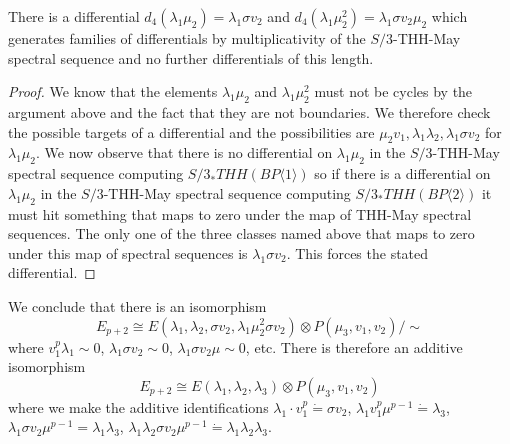 \begin{lem}
There is a differential $d_{4}(\lambda_1\mu_2)=\lambda_1\sigma v_2$ and $d_{4}(\lambda_1 \mu_2^2)=\lambda_1\sigma v_2\mu_2$ which generates families of differentials by multiplicativity of the $S/3$-THH-May spectral sequence and no further differentials of this length. 
\end{lem}
\begin{proof}
We know that the elements $\lambda_1\mu_2$ and $\lambda_1 \mu_2^2$ must not be cycles by the argument above and the fact that they are not boundaries. We therefore check the possible targets of a differential and the possibilities are $\mu_2v_1, \lambda_1\lambda_2, \lambda_1\sigma v_2$  for $\lambda_1\mu_2$. We now observe that there is no differential on $\lambda_1\mu_2$ in the $S/3$-THH-May spectral sequence computing $S/3_*THH(BP\langle 1\rangle )$ so if there is a differential on $\lambda_1\mu_2$ in the $S/3$-THH-May spectral sequence computing $S/3_*THH(BP\langle 2\rangle )$ it must hit something that maps to zero under the map of THH-May spectral sequences. The only one of the three classes named above that maps to zero under this map of spectral sequences is $\lambda_1\sigma v_2$. This forces the stated differential. 

\end{proof}

We conclude that there is an isomorphism 
\[E_{p+2} \cong  E(\lambda_1,\lambda_2,\sigma v_2, \lambda_1\mu_2^2\sigma v_2)\otimes P( \mu_3 ,v_1 ,v_2) / \sim \]
where $v_1^p\lambda_1 \sim 0$, $\lambda_1\sigma v_2\sim 0$, $\lambda_1\sigma v_2 \mu \sim 0$, etc. 
There is therefore an additive isomorphism 
\[ E_{p+2}\cong E(\lambda_1, \lambda_2, \lambda_3)\otimes P(\mu_3,v_1, v_2) \]
where we make the additive identifications $\lambda_1\cdot v_1^p\dot{=} \sigma v_2$, $\lambda_1v_1^p\mu^{p-1}\dot{=}\lambda_3$, $\lambda_1\sigma v_2\mu^{p-1}=\lambda_1\lambda_3$, $\lambda_1\lambda_2\sigma v_2\mu^{p-1}\dot{=}\lambda_1\lambda_2\lambda_3$. 

